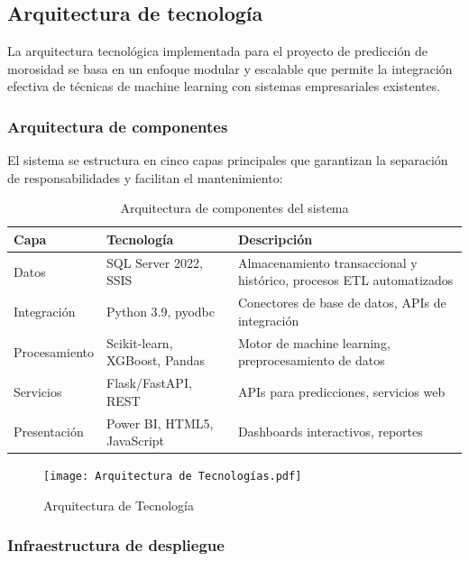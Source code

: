 \subsection{Arquitectura de tecnología}

La arquitectura tecnológica implementada para el proyecto de predicción de morosidad se basa en un enfoque modular y escalable que permite la integración efectiva de técnicas de machine learning con sistemas empresariales existentes.


        
\subsubsection{Arquitectura de componentes}

El sistema se estructura en cinco capas principales que garantizan la separación de responsabilidades y facilitan el mantenimiento:

\begin{table}[ht]
\centering
\begin{tabular}{|p{3cm}|p{4cm}|p{7cm}|}
\hline
\textbf{Capa} & \textbf{Tecnología} & \textbf{Descripción} \\
\hline
Datos & SQL Server 2022, SSIS & Almacenamiento transaccional y histórico, procesos ETL automatizados \\
\hline
Integración & Python 3.9, pyodbc & Conectores de base de datos, APIs de integración \\
\hline
Procesamiento & Scikit-learn, XGBoost, Pandas & Motor de machine learning, preprocesamiento de datos \\
\hline
Servicios & Flask/FastAPI, REST & APIs para predicciones, servicios web \\
\hline
Presentación & Power BI, HTML5, JavaScript & Dashboards interactivos, reportes \\
\hline
\end{tabular}
\caption{Arquitectura de componentes del sistema}
\end{table}
 
\vfill
    \begin{figure}
    \centering    \texttt{[image: Arquitectura de Tecnologías.pdf]}
    \caption{Arquitectura de Tecnología}
    \label{fig:enter-label}
    \end{figure}
    \vfill
    \newpage 
   

\subsubsection{Infraestructura de despliegue}

